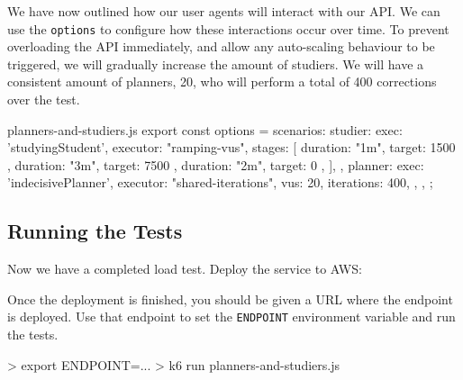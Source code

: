 \documentclass{csse4400}
\begin{document}
We have now outlined how our user agents will interact with our API.
We can use the \texttt{options} to configure how these interactions occur over time.
To prevent overloading the API immediately,
and allow any auto-scaling behaviour to be triggered,
we will gradually increase the amount of studiers.
We will have a consistent amount of planners, 20,
who will perform a total of 400 corrections over the test.
%
\begin{code}[language=JavaScript,numbers=none]{planners-and-studiers.js}
export const options = {
    scenarios: {
        studier: {
            exec: 'studyingStudent',
            executor: "ramping-vus",
            stages: [
                { duration: "1m", target: 1500 },
                { duration: "3m", target: 7500 },
                { duration: "2m", target: 0 },
            ],
        },
        planner: {
            exec: 'indecisivePlanner',
            executor: "shared-iterations",
            vus: 20,
            iterations: 400,
        },
    },
};
\end{code}

\subsection{Running the Tests}

Now we have a completed load test.
Deploy the service to AWS:


Once the deployment is finished,
you should be given a URL where the endpoint is deployed.
Use that endpoint to set the \texttt{ENDPOINT} environment variable and run the tests.
%
\begin{code}[language=bash,numbers=none]{}
> export ENDPOINT=...
> k6 run planners-and-studiers.js
\end{code}
\end{document}
